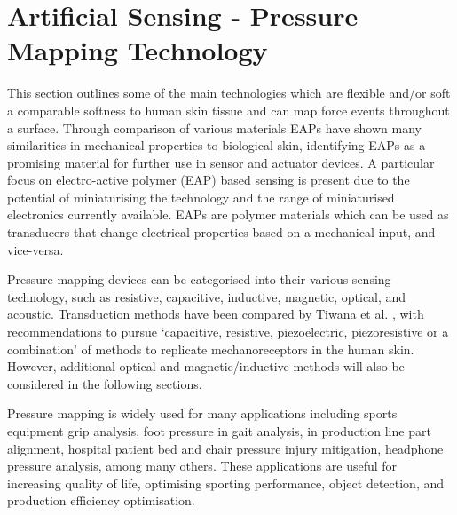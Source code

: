 \section{Artificial Sensing - Pressure Mapping Technology}
This section outlines some of the main technologies which are flexible and/or soft a comparable softness to human skin tissue and can map force events throughout a surface.
Through comparison of various materials EAPs have shown many similarities in mechanical properties to biological skin, identifying EAPs as a promising material for further use in sensor and actuator devices. A particular focus on electro-active polymer (EAP) based sensing is present due to the potential of miniaturising the technology and the range of miniaturised electronics currently available. EAPs are polymer materials which can be used as transducers that change electrical properties based on a mechanical input, and vice-versa.

Pressure mapping devices can be categorised into their various sensing technology, such as resistive, capacitive, inductive, magnetic, optical, and acoustic. Transduction methods have been compared by Tiwana et al. \cite{Tiwana2012}, with recommendations to pursue `capacitive, resistive, piezoelectric, piezoresistive or a combination' of methods to replicate mechanoreceptors in the human skin. However, additional optical and magnetic/inductive methods will also be considered in the following sections.

Pressure mapping is widely used for many applications including sports equipment grip analysis, foot pressure in gait analysis, in production line part alignment, hospital patient bed and chair pressure injury mitigation, headphone pressure analysis, among many others. These applications are useful for increasing quality of life, optimising sporting performance, object detection, and production efficiency optimisation.

